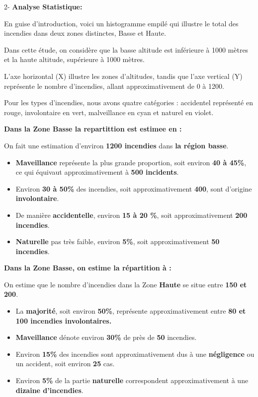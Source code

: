 \documentclass[
]{article}
\begin{document}
2- \textbf{Analyse Statistique:}

En guise d'introduction, voici un histogramme empilé qui illustre le
total des incendies dans deux zones distinctes, Basse et Haute.

Dans cette étude, on considère que la basse altitude est inférieure à
1000 mètres et la haute altitude, supérieure à 1000 mètres.

L'axe horizontal (X) illustre les zones d'altitudes, tandis que l'axe
vertical (Y) représente le nombre d'incendies, allant approximativement
de 0 à 1200.

Pour les types d'incendies, nous avons quatre catégories : accidentel
représenté en rouge, involontaire en vert, malveillance en cyan et
naturel en violet.

\textbf{Dans la Zone Basse la repartittion est estimee en :}

On fait une estimation d'environ \textbf{1200 incendies} dans \textbf{la
région basse}.

\begin{itemize}
\item
  \textbf{Maveillance} représente la plus grande proportion, soit
  environ \textbf{40 à 45\%}, ce qui équivaut approximativement à
  \textbf{500 incidents}.
\item
  Environ \textbf{30 à 50\%} des incendies, soit approximativement
  \textbf{400}, sont d'origine \textbf{involontaire}.
\item
  De manière \textbf{accidentelle}, environ \textbf{15 à 20 \%}, soit
  approximativement \textbf{200 incendies}.
\item
  \textbf{Naturelle} pas très faible, environ \textbf{5\%}, soit
  approximativement \textbf{50 incendies}.
\end{itemize}

\textbf{Dans la Zone Basse, on estime la répartition à : }

On estime que le nombre d'incendies dans la Zone \textbf{Haute} se situe
entre \textbf{150 et 200}.

\begin{itemize}
\item
  La \textbf{majorité}, soit environ \textbf{50\%}, représente
  approximativement entre \textbf{80 et 100 incendies involontaires. }
\item
  \textbf{Maveillance} dénote environ \textbf{30\%} de près de
  \textbf{50} incendies.
\item
  Environ \textbf{15\%} des incendies sont approximativement dus à une
  \textbf{négligence} ou un accident, soit environ \textbf{25} cas.
\item
  Environ \textbf{5\%} de la partie \textbf{naturelle} correspondent
  approximativement à une \textbf{dizaine d'incendies}.
\end{itemize}
\end{document}
